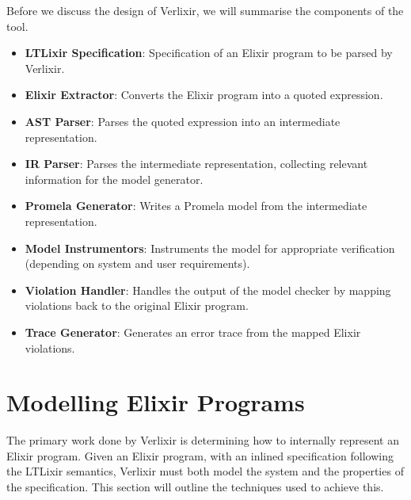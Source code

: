Before we discuss the design of Verlixir, we will summarise the components of the tool.
\begin{itemize}
    \item \textbf{LTLixir Specification}: Specification of an Elixir program to be parsed by Verlixir.
    \item \textbf{Elixir Extractor}: Converts the Elixir program into a quoted expression.
    \item \textbf{AST Parser}: Parses the quoted expression into an intermediate representation.
    \item \textbf{IR Parser}: Parses the intermediate representation, collecting relevant information for the model generator.
    \item \textbf{Promela Generator}: Writes a Promela model from the intermediate representation.
    \item \textbf{Model Instrumentors}: Instruments the model for appropriate verification (depending on system and user requirements).
    \item \textbf{Violation Handler}: Handles the output of the model checker by mapping violations back to the original Elixir program.
    \item \textbf{Trace Generator}: Generates an error trace from the mapped Elixir violations.
\end{itemize}

\section{Modelling Elixir Programs} \label{sec:modelling_elixir_programs}
The primary work done by Verlixir is determining how to internally represent an Elixir program. Given an Elixir program, with an inlined specification following the LTLixir semantics, Verlixir must both model the system and the properties of the specification. This section will outline the techniques used to achieve this.
